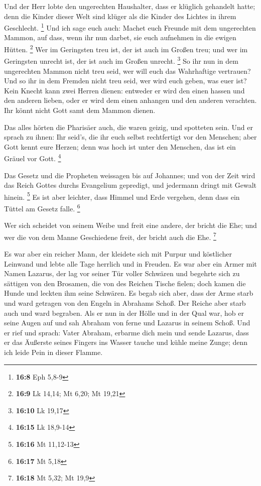  Und der Herr lobte den ungerechten Haushalter, dass er
klüglich gehandelt hatte; denn die Kinder dieser Welt sind klüger als
die Kinder des Lichtes in ihrem Geschlecht. \footnote{\textbf{16:8} Eph
  5,8-9}  Und ich sage euch auch: Machet euch Freunde mit
dem ungerechten Mammon, auf dass, wenn ihr nun darbet, sie euch
aufnehmen in die ewigen Hütten. \footnote{\textbf{16:9} Lk 14,14; Mt
  6,20; Mt 19,21}  Wer im Geringsten treu ist, der ist auch
im Großen treu; und wer im Geringsten unrecht ist, der ist auch im
Großen unrecht. \footnote{\textbf{16:10} Lk 19,17}  So ihr
nun in dem ungerechten Mammon nicht treu seid, wer will euch das
Wahrhaftige vertrauen?  Und so ihr in dem Fremden nicht
treu seid, wer wird euch geben, was euer ist?  Kein Knecht
kann zwei Herren dienen: entweder er wird den einen hassen und den
anderen lieben, oder er wird dem einen anhangen und den anderen
verachten. Ihr könnt nicht Gott samt dem Mammon dienen.

 Das alles hörten die Pharisäer auch, die waren geizig, und
spotteten sein.  Und er sprach zu ihnen: Ihr seid's, die
ihr euch selbst rechtfertigt vor den Menschen; aber Gott kennt eure
Herzen; denn was hoch ist unter den Menschen, das ist ein Gräuel vor
Gott. \footnote{\textbf{16:15} Lk 18,9-14}

 Das Gesetz und die Propheten weissagen bis auf Johannes;
und von der Zeit wird das Reich Gottes durchs Evangelium gepredigt, und
jedermann dringt mit Gewalt hinein. \footnote{\textbf{16:16} Mt 11,12-13}
 Es ist aber leichter, dass Himmel und Erde vergehen, denn
dass ein Tüttel am Gesetz falle. \footnote{\textbf{16:17} Mt 5,18}

 Wer sich scheidet von seinem Weibe und freit eine andere,
der bricht die Ehe; und wer die von dem Manne Geschiedene freit, der
bricht auch die Ehe. \footnote{\textbf{16:18} Mt 5,32; Mt 19,9}

 Es war aber ein reicher Mann, der kleidete sich mit Purpur
und köstlicher Leinwand und lebte alle Tage herrlich und in Freuden.
 Es war aber ein Armer mit Namen Lazarus, der lag vor
seiner Tür voller Schwären  und begehrte sich zu sättigen
von den Brosamen, die von des Reichen Tische fielen; doch kamen die
Hunde und leckten ihm seine Schwären.  Es begab sich aber,
dass der Arme starb und ward getragen von den Engeln in Abrahams Schoß.
Der Reiche aber starb auch und ward begraben.  Als er nun
in der Hölle und in der Qual war, hob er seine Augen auf und sah Abraham
von ferne und Lazarus in seinem Schoß.  Und er rief und
sprach: Vater Abraham, erbarme dich mein und sende Lazarus, dass er das
Äußerste seines Fingers ins Wasser tauche und kühle meine Zunge; denn
ich leide Pein in dieser Flamme.

